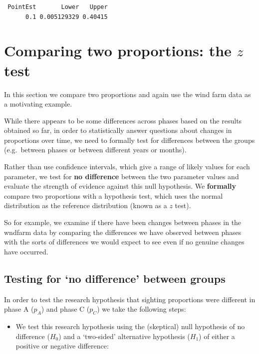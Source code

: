 \documentclass[
  oneside]{krantz}
\providecommand{\tightlist}{%
  \setlength{\itemsep}{0pt}\setlength{\parskip}{0pt}}
\begin{document}
\begin{verbatim}
 PointEst       Lower   Upper
      0.1 0.005129329 0.40415
\end{verbatim}

\hypertarget{comparing-two-proportions-the-z-test}{%
\section{\texorpdfstring{Comparing two proportions: the \(z\) test}{Comparing two proportions: the z test}}\label{comparing-two-proportions-the-z-test}}

In this section we compare two proportions and again use the wind farm data as a motivating example.

While there appears to be some differences across phases based on the results obtained so far, in order to statistically answer questions about changes in proportions over time, we need to formally test for differences between the groups (e.g.~between phases or between different years or months).

Rather than use confidence intervals, which give a range of likely values for each parameter, we test for \textbf{no difference} between the two parameter values and evaluate the strength of evidence against this null hypothesis. We \textbf{formally} compare two proportions with a hypothesis test, which uses the normal distribution as the reference distribution (known as a \(z\) test).

So for example, we examine if there have been changes between phases in the wndfarm data by comparing the differences we have observed between phases with the sorts of differences we would expect to see even if no genuine changes have occurred.

\hypertarget{testing-for-no-difference-between-groups}{%
\subsection{Testing for `no difference' between groups}\label{testing-for-no-difference-between-groups}}

In order to test the research hypothesis that sighting proportions were different in phase A (\(p_{A}\)) and phase C (\(p_{C}\)) we take the following steps:

\begin{itemize}
\tightlist
\item
  We test this research hypothesis using the (skeptical) null hypothesis of no difference (\(H_0\)) and a `two-sided' alternative hypothesis (\(H_1\)) of either a positive or negative difference:
\end{itemize}
\end{document}
